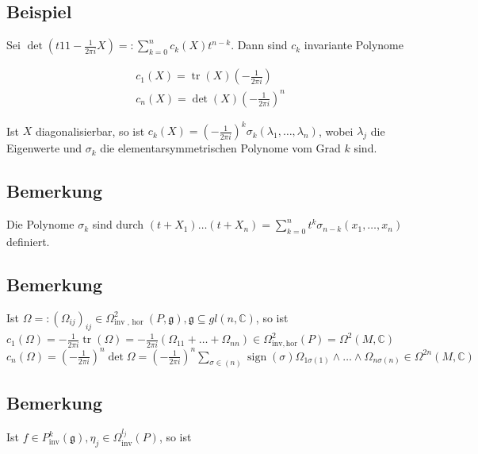 \documentclass[10pt, letterpaper]{article}
\begin{document}
\subsection*{Beispiel}
Sei $\operatorname{det}\left(t 11-\frac{1}{2 \pi i} X\right)=: \sum_{k=0}^{n} c_{k}(X) t^{n-k}$. Dann sind $c_{k}$ invariante Polynome

$$
\begin{aligned}
& c_{1}(X)=\operatorname{tr}(X)\left(-\frac{1}{2 \pi i}\right) \\
& c_{n}(X)=\operatorname{det}(X)\left(-\frac{1}{2 \pi i}\right)^{n}
\end{aligned}
$$

Ist $X$ diagonalisierbar, so ist $c_{k}(X)=\left(-\frac{1}{2 \pi i}\right)^{k} \sigma_{k}\left(\lambda_{1}, \ldots, \lambda_{n}\right)$, wobei $\lambda_{j}$ die Eigenwerte und $\sigma_{k}$ die elementarsymmetrischen Polynome vom Grad $k$ sind.

\subsection*{Bemerkung}
Die Polynome $\sigma_{k}$ sind durch $\left(t+X_{1}\right) \ldots\left(t+X_{n}\right)=\sum_{k=0}^{n} t^{k} \sigma_{n-k}\left(x_{1}, \ldots, x_{n}\right)$ definiert.

\subsection*{Bemerkung}
Ist $\Omega=:\left(\Omega_{i j}\right)_{i j} \in \Omega_{\text {inv }, \text { hor }}^{2}(P, \mathfrak{g}), \mathfrak{g} \subseteq g l(n, \mathbb{C})$, so ist\\
$c_{1}(\Omega)=-\frac{1}{2 \pi i} \operatorname{tr}(\Omega)=-\frac{1}{2 \pi i}\left(\Omega_{11}+\ldots+\Omega_{n n}\right) \in \Omega_{\mathrm{inv}, \mathrm{hor}}^{2}(P)=\Omega^{2}(M, \mathbb{C})$\\
$c_{n}(\Omega)=\left(-\frac{1}{2 \pi i}\right)^{n} \operatorname{det} \Omega=\left(-\frac{1}{2 \pi i}\right)^{n} \sum_{\sigma \in(n)} \operatorname{sign}(\sigma) \Omega_{1 \sigma(1)} \wedge \ldots \wedge \Omega_{n \sigma(n)} \in \Omega^{2 n}(M, \mathbb{C})$

\subsection*{Bemerkung}
Ist $f \in P_{\mathrm{inv}}^{k}(\mathfrak{g}), \eta_{j} \in \Omega_{\mathrm{inv}}^{l_{j}}(P)$, so ist
\end{document}
